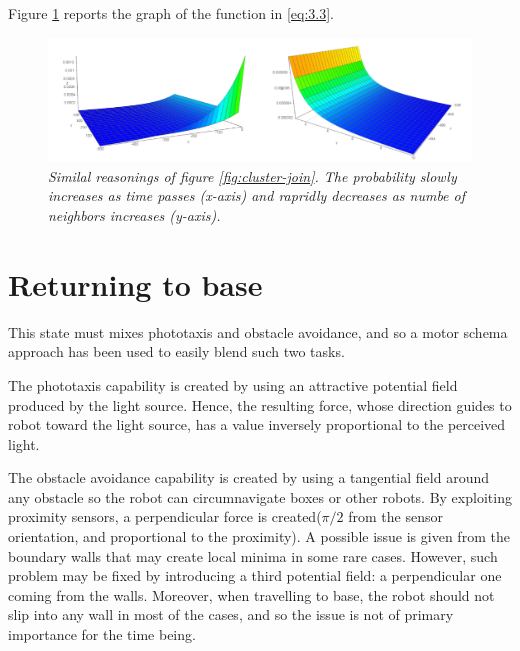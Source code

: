 \noindent
Figure \ref{fig:cluster-leave} reports the graph of the function in \ref{eq:3.3}.

\begin{figure}[H]
\centering
\includegraphics[width=\linewidth]{images/cluster_leave.png}
\caption{\textit{Similal reasonings of figure \ref{fig:cluster-join}. The probability slowly increases as time passes (x-axis) and rapridly decreases as numbe of neighbors increases (y-axis).}}
\label{fig:cluster-leave}
\end{figure}

\section{Returning to base}

This state must mixes phototaxis and obstacle avoidance, and so a motor schema approach has been used to easily blend such two tasks.

\smallskip
The phototaxis capability is created by using an attractive potential field produced by the light source. Hence, the resulting force, whose direction guides to robot toward the light source, has a value inversely proportional to the perceived light.

\smallskip
The obstacle avoidance capability is created by using a tangential field around any obstacle so the robot can circumnavigate boxes or other robots. By exploiting proximity sensors, a perpendicular force is created($\pi/2$ from the sensor orientation, and proportional to the proximity). A possible issue is given from the boundary walls that may create local minima in some rare cases. However, such problem may be fixed by introducing a third potential field: a perpendicular one coming from the walls. Moreover, when travelling to base, the robot should not slip into any wall in most of the cases, and so the issue is not of primary importance for the time being.
 


